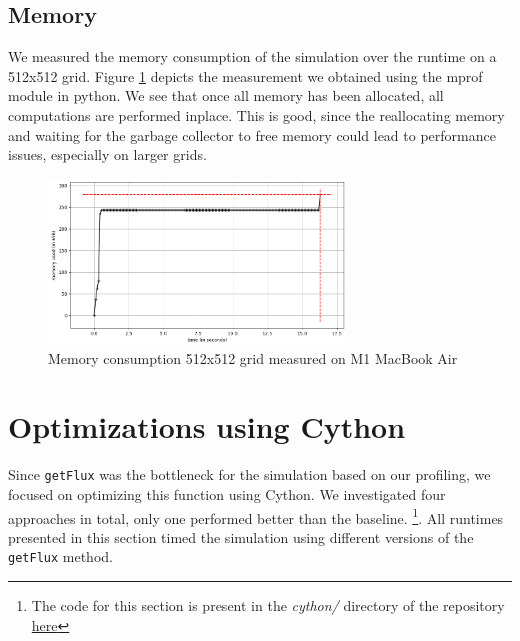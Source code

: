 \documentclass[a4paper,10pt]{article}
\begin{document}
\subsection{Memory}
We measured the memory consumption of the simulation over the runtime on a 512x512 grid.
Figure \ref{fig:memory_over_simulation} depicts the measurement we obtained using the mprof module in python.
We see that once all memory has been allocated, all computations are performed inplace.
This is good, since the reallocating memory and waiting for the garbage collector to free memory could lead to performance issues, especially on larger grids.

\begin{figure}[h]
  \centering
  \includegraphics[width=0.7\textwidth]{images/baseline/baseline_memory_512.png}
  \caption{Memory consumption 512x512 grid measured on M1 MacBook Air}
  \label{fig:memory_over_simulation}
\end{figure}

\section{Optimizations using Cython}
Since \verb|getFlux| was the bottleneck for the simulation based on our profiling, we focused on optimizing this function using Cython.
We investigated four approaches in total, only one performed better than the baseline. \footnote{The code for this section is present in the \textit{cython/} directory of the repository \href{https://github.com/paulmyr/DD2358-HPC25/blob/master/10_project_rishi_paul/code/cython/finitevolume_cython_lib.pyx}{here}}.
All runtimes presented in this section timed the simulation using different versions of the \verb|getFlux| method.
\end{document}
